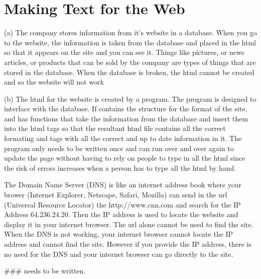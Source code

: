 \chapter{Making Text for the Web}


\begin{exercises}

\begin{ex}%
(a) The company stores information from it's website in a database.
When you go to the website, the information is taken from the database and
placed in the html so that it appears on the site and you can see it.
Things like pictures, or news articles, or products that can be sold by the
company are types of things that are stored in the database.  When the
database is broken, the html cannot be created and so the website will not
work
\newline

(b)  The html for the website is created by a program. The program is
designed to interface with the database. If contains the structure for the
format of the site, and has functions that take the information from the
database and insert them into the html tags so that the resultant html file
contains all the correct formating and tags with all the correct and up to
date information in it. The program only needs to be written once and can
run over and over again to update the page without having to rely on people
to type in all the html since the risk of errors increases when a person
has to type all the html by hand.
\end{ex}

\begin{ex}%
The Domain Name Server (DNS) is like an internet address book where your
brower (Internet Explorer, Netscape, Safari, Mozilla) can send
in the url (Universal Resource Locator) the http://www.cnn.com and search
for the IP Address 64.236.24.20. Then the IP address is used
to locate the website and display it in your internet browser. The url
alone cannot be used to find the site. When the DNS is not
working, your internet browser cannot locate the IP address and cannot find
the site. However if you provide the IP address, there is
no need for the DNS and your internet browser can go directly to the site.
\end{ex}

\begin{ex}%
\begin{example}
### needs to be written.


\end{example}
\end{ex}
\end{exercises}
